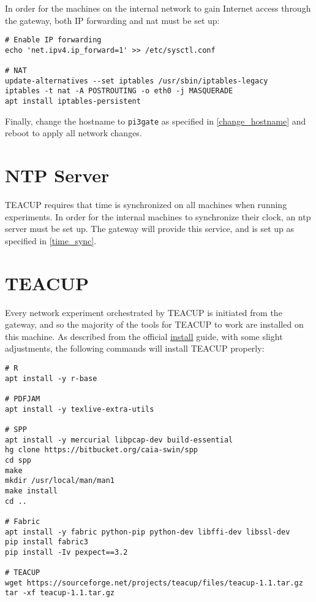 In order for the machines on the internal network to gain Internet access through the gateway, both IP forwarding and \gls{nat} must be set up:

\begin{lstlisting}
# Enable IP forwarding
echo 'net.ipv4.ip_forward=1' >> /etc/sysctl.conf

# NAT
update-alternatives --set iptables /usr/sbin/iptables-legacy
iptables -t nat -A POSTROUTING -o eth0 -j MASQUERADE
apt install iptables-persistent
\end{lstlisting}

Finally, change the hostname to \lstinline{pi3gate} as specified in \ref{change_hostname} and reboot to apply all network changes.


\section{NTP Server}

TEACUP requires that time is synchronized on all machines when running experiments. In order for the internal machines to synchronize their clock, an \gls{ntp} server must be set up. The gateway will provide this service, and is set up as specified in \ref{time_sync}.


\section{TEACUP}

Every network experiment orchestrated by TEACUP is initiated from the gateway, and so the majority of the tools for TEACUP to work are installed on this machine. As described from the official \href{http://caia.swin.edu.au/tools/teacup/TEACUP-0.9_INSTALL.txt}{install} guide, with some slight adjustments, the following commands will install TEACUP properly:

\begin{lstlisting}
# R
apt install -y r-base

# PDFJAM
apt install -y texlive-extra-utils

# SPP
apt install -y mercurial libpcap-dev build-essential
hg clone https://bitbucket.org/caia-swin/spp
cd spp
make
mkdir /usr/local/man/man1
make install
cd ..

# Fabric
apt install -y fabric python-pip python-dev libffi-dev libssl-dev
pip install fabric3
pip install -Iv pexpect==3.2

# TEACUP
wget https://sourceforge.net/projects/teacup/files/teacup-1.1.tar.gz
tar -xf teacup-1.1.tar.gz
\end{lstlisting}

